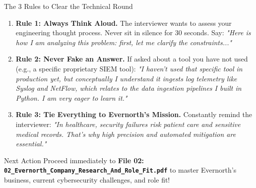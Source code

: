 \documentclass[11pt,a4paper]{article}
\begin{document}
\begin{trapbox}{The 3 Rules to Clear the Technical Round}
\begin{enumerate}
    \item \textbf{Rule 1: Always Think Aloud.} The interviewer wants to assess your engineering thought process. Never sit in silence for 30 seconds. Say: \textit{"Here is how I am analyzing this problem: first, let me clarify the constraints..."}
    \item \textbf{Rule 2: Never Fake an Answer.} If asked about a tool you have not used (e.g., a specific proprietary SIEM tool): \textit{"I haven't used that specific tool in production yet, but conceptually I understand it ingests log telemetry like Syslog and NetFlow, which relates to the data ingestion pipelines I built in Python. I am very eager to learn it."}
    \item \textbf{Rule 3: Tie Everything to Evernorth's Mission.} Constantly remind the interviewer: \textit{"In healthcare, security failures risk patient care and sensitive medical records. That's why high precision and automated mitigation are essential."}
\end{enumerate}
\end{trapbox}

\begin{evernorthbox}{Next Action}
Proceed immediately to \textbf{File 02: \texttt{02\_Evernorth\_Company\_Research\_And\_Role\_Fit.pdf}} to master Evernorth's business, current cybersecurity challenges, and role fit!
\end{evernorthbox}
\end{document}
